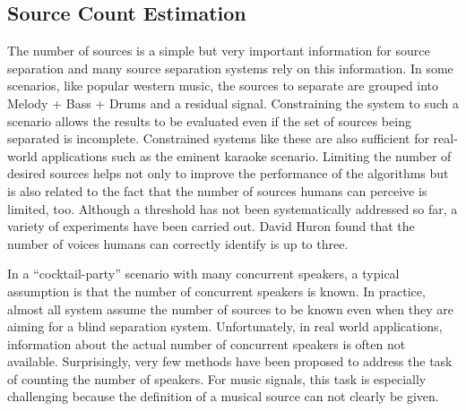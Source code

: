 \subsection{Source Count Estimation}
The number of sources is a simple but very important information for source separation and many source separation systems rely on this information. 
In some scenarios, like popular western music, the sources to separate are grouped into Melody + Bass + Drums and a residual signal. 
Constraining the system to such a scenario allows the results to be evaluated even if the set of sources being separated is incomplete. Constrained systems like these are also sufficient for real-world applications such as the eminent karaoke scenario. Limiting the number of desired sources helps not only to improve the performance of the algorithms but is also related to the fact that the number of sources humans can perceive is limited, too. Although a threshold has not been systematically addressed so far, a variety of experiments have been carried out. 
David Huron found \cite{huron89} that the number of voices humans can correctly identify is up to three.
\par
In a “cocktail-party” scenario with many concurrent speakers, a typical assumption is that the number of concurrent speakers is known.
In practice, almost all system assume the number of sources to be known even when they are aiming for a blind separation system.
Unfortunately, in real world applications, information about the actual number of concurrent speakers
is often not available.
Surprisingly, very few methods have been proposed to address the task of
counting the number of speakers.
For music signals, this task is especially challenging because the definition of a musical source can not clearly be given.

